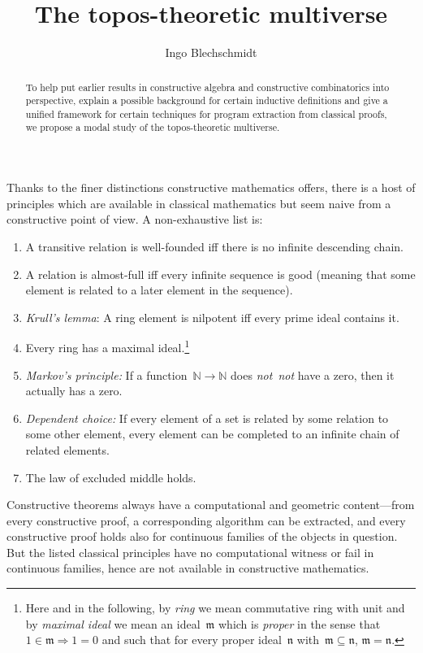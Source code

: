 \documentclass[oneside]{amsart}
\title{The topos-theoretic multiverse}
\author{Ingo Blechschmidt}
\theoremstyle{definition}
\theoremstyle{plain}
\theoremstyle{remark}
\newcommand{\mmm}{\mathfrak{m}}
\newcommand{\nnn}{\mathfrak{n}}
\newcommand{\NN}{\mathbb{N}}
\renewcommand{\_}{\mathpunct{.}\,}
\newcommand{\notnot}{\emph{not~not}\xspace}
\begin{document}
\begin{abstract}
  To help put earlier results in constructive algebra and constructive
  combinatorics into perspective, explain a possible background for certain
  inductive definitions and give a unified framework for certain techniques for
  program extraction from classical proofs, we propose a modal study of the
  topos-theoretic multiverse.
\end{abstract}

\maketitle
\thispagestyle{empty}

\noindent
Thanks to the finer distinctions constructive mathematics offers, there is a
host of principles which are available in classical mathematics but seem naive
from a constructive point of view. A non-exhaustive list is:
\begin{enumerate}
\item A transitive relation is well-founded iff there is no infinite descending
chain.
\item A relation is almost-full iff every infinite sequence is good (meaning
that some element is related to a later element in the sequence).
\item \emph{Krull's lemma}: A ring element is nilpotent iff every prime
ideal contains it.
\item Every ring has a maximal ideal.\footnote{Here and in the following, by
\emph{ring} we mean commutative ring with unit and by \emph{maximal ideal} we
mean an ideal~$\mmm$ which is \emph{proper} in the sense that~$1 \in \mmm
\Rightarrow 1 = 0$ and such that for every proper ideal~$\nnn$ with~$\mmm
\subseteq \nnn$, $\mmm = \nnn$.}
\item \emph{Markov's principle:} If a function~$\NN \to \NN$ does \notnot have
a zero, then it actually has a zero.
\item \emph{Dependent choice:} If every element of a set is related by some relation to some other
element, every element can be completed to an infinite chain of related
elements.
\item The law of excluded middle holds.
\end{enumerate}
Constructive theorems always have a computational and geometric
content---from every constructive proof, a corresponding algorithm can be
extracted, and every constructive proof holds also for continuous families of
the objects in question. But the listed classical principles have no
computational witness or fail in continuous families, hence are not
available in constructive mathematics.
\end{document}
